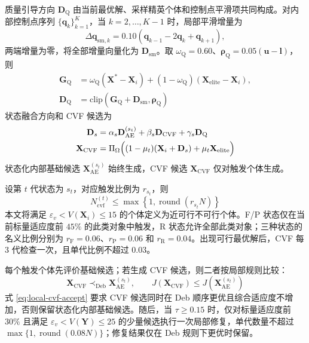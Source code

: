 质量引导方向 $\mathbf D_{\mathrm Q}$ 由当前最优解、采样精英个体和控制点平滑项共同构成。对内部控制点序列 $\{\mathbf q_k\}_{k=1}^{K}$，当 $k=2,\ldots,K-1$ 时，局部平滑增量为
\begin{equation}
    \Delta\mathbf q_{\mathrm{sm},k}
    =0.10(\mathbf q_{k-1}-2\mathbf q_k+\mathbf q_{k+1}),
    \label{eq:quality-smoothing}
\end{equation}
两端增量为零，将全部增量向量化为 $\mathbf D_{\mathrm{sm}}$。取 $\omega_{\mathrm Q}=0.60$、$\boldsymbol\rho_{\mathrm Q}=0.05(\mathbf u-\mathbf l)$，则
\begin{equation}
    \begin{aligned}
    \mathbf G_{\mathrm Q}
    &={}\omega_{\mathrm Q}(\mathbf X^*-\mathbf X_i)
    +(1-\omega_{\mathrm Q})(\mathbf X_{\mathrm{elite}}-\mathbf X_i),\\
    \mathbf D_{\mathrm Q}
    &=\mathrm{clip}(\mathbf G_{\mathrm Q}+\mathbf D_{\mathrm{sm}},\boldsymbol\rho_{\mathrm Q})
    \end{aligned}
    \label{eq:quality-step}
\end{equation}
状态融合方向和 CVF 候选为
\begin{equation}
    \begin{aligned}
    \mathbf{D}_s
    &=
    \alpha_s \mathbf{D}_{\mathrm{AE}}^{(s_t)}
    + \beta_s \mathbf{D}_{\mathrm{CVF}}
    + \gamma_s \mathbf{D}_{\mathrm{Q}}\\
    \mathbf{X}_{\mathrm{CVF}}
    &=
    \Pi_{\Omega}
    \Bigl(
    (1-\mu_t)(\mathbf{X}_i+\mathbf{D}_s)
    +\mu_t\mathbf{X}_{\mathrm{elite}}
    \Bigr)
    \end{aligned}
    \label{eq:cvf-candidate}
\end{equation}
状态化内部基础候选 $\mathbf{X}_{\mathrm{AE}}^{(s_t)}$ 始终生成，CVF 候选 $\mathbf{X}_{\mathrm{CVF}}$ 仅对触发个体生成。

设第 $t$ 代状态为 $s_t$，对应触发比例为 $r_{s_t}$，则
\begin{equation}
    N_{\mathrm{cvf}}^{(t)}\leq
    \max\!\left\{1,\operatorname{round}(r_{s_t}N)\right\}
    \label{eq:cvf-quota}
\end{equation}
本文将满足 $\varepsilon_v<V(\mathbf X_i)\leq15$ 的个体定义为近可行不可行个体。F/P 状态仅在当前标量适应度前 $45\%$ 的此类对象中触发，R 状态允许全部此类对象；三种状态的名义比例分别为 $r_{\mathrm F}=0.06$、$r_{\mathrm P}=0.06$ 和 $r_{\mathrm R}=0.04$。出现可行最优解后，CVF 每 $3$ 代检查一次，且单代比例不超过 $0.03$。

每个触发个体先评价基础候选；若生成 CVF 候选，则二者按局部规则比较：
\begin{equation}
    \mathbf{X}_{\mathrm{CVF}}
    \prec_{\mathrm{Deb}}
    \mathbf{X}_{\mathrm{AE}}^{(s_t)},
    \qquad
    J(\mathbf{X}_{\mathrm{CVF}})
    \leq
    J(\mathbf{X}_{\mathrm{AE}}^{(s_t)})
    \label{eq:local-cvf-accept}
\end{equation}
式 \eqref{eq:local-cvf-accept} 要求 CVF 候选同时在 Deb 顺序更优且综合适应度不增加，否则保留状态化内部基础候选。随后，当 $\tau\geq0.15$ 时，仅对标量适应度前 $30\%$ 且满足 $\varepsilon_v<V(\mathbf Y)\leq25$ 的少量候选执行一次局部修复，单代数量不超过 $\max\{1,\operatorname{round}(0.08N)\}$；修复结果仅在 Deb 规则下更优时保留。

